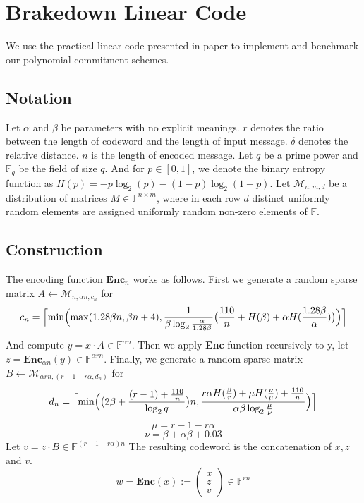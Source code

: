 \chapter{Brakedown Linear Code}

We use the practical linear code presented in paper \cite{brakedown} to implement and benchmark our polynomial commitment schemes.

\section{Notation}

Let $\alpha$ and $\beta$ be parameters with no explicit meanings. $r$ denotes the ratio between the length of codeword and the length of input message. $\delta$ denotes the relative distance. $n$ is the length of encoded message. Let $q$ be a prime power and $\mathbb{F}_q$ be the field of size $q$. And for $p \in [0, 1]$, we denote the binary entropy function as $H(p) = -p\log_2(p) - (1 - p)\log_2(1-p)$. Let $\mathcal{M}_{n, m, d}$ be a distribution of matrices $M \in \mathbb{F}^{n \times m}$, where in each row $d$ distinct uniformly random elements are assigned uniformly random non-zero elements of $\mathbb{F}$.

\section{Construction}

The encoding function $\textbf{Enc}_n$ works as follows. First we generate a random sparse matrix $A \leftarrow \mathcal{M}_{n, \alpha n, c_n}$ for 
$$
    c_n = \Bigl \lceil \min \Bigl( \max (1.28 \beta n, \beta n + 4), \frac{1}{\beta \log_2 \frac{\alpha}{1.28 \beta}} \bigl( \frac{110}{n} + H(\beta) + \alpha H (\frac{1.28 \beta}{\alpha}) \bigr) \Bigr) \Bigr \rceil
$$
And compute $y = x \cdot A \in \mathbb{F}^{\alpha n}$. Then we apply \textbf{Enc} function recursively to y, let $z = \textbf{Enc}_{\alpha n}(y) \in \mathbb{F}^{\alpha r n}$. Finally, we generate a random sparse matrix $B \leftarrow \mathcal{M}_{\alpha r n, (r - 1 - r \alpha, d_n)}$ for
$$
    d_n = \Bigl \lceil \min \Bigl( \bigl( 2\beta + \frac{(r-1) + \frac{110}{n}}{\log_2 q} \bigr)n, \frac{r \alpha H(\frac{\beta}{r}) + \mu H(\frac{\nu}{\mu}) + \frac{110}{n}}{\alpha \beta \log_2 \frac{\mu}{\nu}} \Bigr) \Bigr \rceil
$$
$$
    \mu = r - 1 - r \alpha
$$
$$
    \nu = \beta + \alpha \beta + 0.03
$$
Let $v = z \cdot B \in \mathbb{F}^{(r - 1 - r\alpha)n}$ The resulting codeword is the concatenation of $x, z$ and $v$.
$$
    w = \textbf{Enc}(x) := \left( \begin{array}{c} x \\ z \\ v \end{array} \right) 
    \in \mathbb{F}^{rn}
$$

